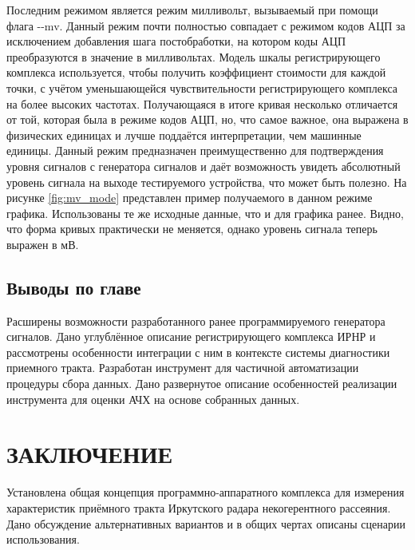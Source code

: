 \documentclass{report}
\begin{document}

Последним режимом является режим милливольт, вызываемый при помощи флага -{}-mv. Данный режим почти полностью совпадает с режимом кодов АЦП за исключением добавления шага постобработки, на котором коды АЦП преобразуются в значение в милливольтах. Модель шкалы регистрирующего комплекса используется, чтобы получить коэффициент стоимости для каждой точки, с учётом уменьшающейся чувствительности регистрирующего комплекса на более высоких частотах. Получающаяся в итоге кривая несколько отличается от той, которая была в режиме кодов АЦП, но, что самое важное, она выражена в физических единицах и лучше поддаётся интерпретации, чем машинные единицы. Данный режим предназначен преимущественно для подтверждения уровня сигналов с генератора сигналов и даёт возможность увидеть абсолютный уровень сигнала на выходе тестируемого устройства, что может быть полезно. На рисунке \ref{fig:mv_mode} представлен пример получаемого в данном режиме графика. Использованы те же исходные данные, что и для графика ранее. Видно, что форма кривых практически не меняется, однако уровень сигнала теперь выражен в мВ.


\section*{Выводы по главе}
Расширены возможности разработанного ранее программируемого генератора сигналов. Дано углублённое описание регистрирующего комплекса ИРНР и рассмотрены особенности интеграции с ним в контексте системы диагностики приемного тракта. Разработан инструмент для частичной автоматизации процедуры сбора данных. Дано развернутое описание особенностей реализации инструмента для оценки АЧХ на основе собранных данных.

\chapter*{ЗАКЛЮЧЕНИЕ}

Установлена общая концепция программно-аппаратного комплекса для измерения характеристик приёмного тракта Иркутского радара некогерентного рассеяния. Дано обсуждение альтернативных вариантов и в общих чертах описаны сценарии использования.
\end{document}
